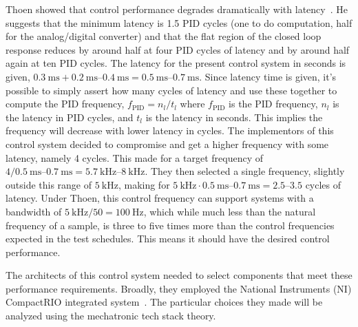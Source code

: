 \documentclass[english,12pt,a4paper,pdftex,eng,utf8]{aaltothesis}
\begin{document}
Thoen showed that control performance degrades dramatically with latency~\cite{Thoen2021}.  He suggests that the minimum latency is 1.5 PID cycles (one to do computation, half for the analog/digital converter) and that the flat region of the closed loop response reduces by around half at four PID cycles of latency and by around half again at ten PID cycles.  The latency for the present control system in seconds is given, $\qty{0.3}{\milli\second} + \qtyrange[range-units=single,range-phrase=..]{0.2}{0.4}{\milli\second} = \qtyrange[range-units=single,range-phrase=..]{0.5}{0.7}{\milli\second}$.  Since latency time is given, it's possible to simply assert how many cycles of latency and use these together to compute the PID frequency, $f_{\mathrm{PID}} = n_l/t_l$ where $f_{\mathrm{PID}}$ is the PID frequency, $n_l$ is the latency in PID cycles, and $t_l$ is the latency in seconds.  This implies the frequency will decrease with lower latency in cycles.  The implementors of this control system decided to compromise and get a higher frequency with some latency, namely 4 cycles.  This made for a target frequency of $4 / \qtyrange[range-units=single,range-phrase=..]{0.5}{0.7}{\milli\second} = \qtyrange[range-units=single,range-phrase=..]{5.7}{8}{\kilo\hertz}$.  They then selected a single frequency, slightly outside this range of $\qty{5}{\kilo\hertz}$, making for $\qty{5}{\kilo\hertz} \cdot \qtyrange[range-units=single,range-phrase=..]{0.5}{0.7}{\milli\second} = \numrange[range-units=single,range-phrase=..]{2.5}{3.5}$ cycles of latency.  Under Thoen, this control frequency can support systems with a bandwidth of $\qty{5}{\kilo\hertz} / 50 = \qty{100}{\hertz}$, which while much less than the natural frequency of a sample, is three to five times more than the control frequencies expected in the test schedules.  This means it should have the desired control performance.

The architects of this control system needed to select components that meet these performance requirements.  Broadly, they employed the National Instruments (NI) CompactRIO integrated system~\cite{NICompactRIO}.  The particular choices they made will be analyzed using the mechatronic tech stack theory.
\end{document}
